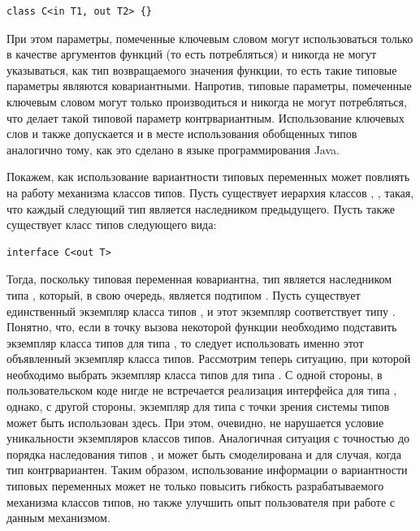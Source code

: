 \begin{lstlisting}[style=wo_caption]
class C<in T1, out T2> {}
\end{lstlisting}
При этом параметры, помеченные ключевым словом  могут использоваться только в качестве аргументов функций (то есть потребляться) и никогда не могут указываться, как тип возвращаемого значения функции, то есть такие типовые параметры являются ковариантными. Напротив, типовые параметры, помеченные ключевым словом  могут только производиться и никогда не могут потребляться, что делает такой типовой параметр контрвариантным. Использование ключевых слов  и  также допускается и в месте использования обобщенных типов аналогично тому, как это сделано в языке программирования Java. 

Покажем, как использование вариантности типовых переменных может повлиять на работу механизма классов типов. Пусть существует иерархия классов , ,  такая, что каждый следующий тип является наследником предыдущего. Пусть также существует класс типов  следующего вида:
\begin{lstlisting}[style=wo_caption]
interface C<out T>
\end{lstlisting}
Тогда, поскольку типовая переменная  ковариантна, тип  является наследником типа , который, в свою очередь, является подтипом . Пусть существует единственный экземпляр класса типов , и этот экземпляр соответствует типу . Понятно, что, если в точку вызова некоторой функции необходимо подставить экземпляр класса типов  для типа , то следует использовать именно этот объявленный экземпляр класса типов. Рассмотрим теперь ситуацию, при которой необходимо выбрать экземпляр класса типов  для типа . С одной стороны, в пользовательском коде нигде не встречается реализация интерфейса  для типа , однако, с другой стороны, экземпляр для типа  с точки зрения системы типов может быть использован здесь. При этом, очевидно, не нарушается условие уникальности экземпляров классов типов. Аналогичная ситуация с точностью до порядка наследования типов ,  и  может быть смоделирована и для случая, когда тип  контрвариантен. Таким образом, использование информации о вариантности типовых переменных может не только повысить гибкость разрабатываемого механизма классов типов, но также улучшить опыт пользователя при работе с данным механизмом.  

